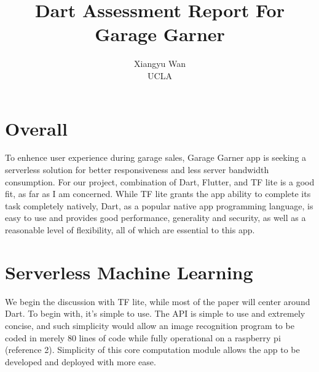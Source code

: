 \documentclass[letterpaper,twocolumn,10pt]{article}
\begin{document}

\date{}

\title{\Large \bf Dart Assessment Report For Garage Garner}

\author{
{\rm Xiangyu Wan}\\
UCLA
} %

\maketitle


\section{Overall}

To enhence user experience during garage sales, Garage Garner app is seeking a serverless solution for better responsiveness 
and less server bandwidth consumption.
For our project, combination of Dart, Flutter, and TF lite is a good fit, as far as I am concerned.
While TF lite grants the app ability to complete its task completely natively,
Dart, as a popular native app programming language, is easy to use and provides good performance, 
generality and security, as well as a reasonable level of flexibility, all of which are essential to this app.

\section{Serverless Machine Learning}

We begin the discussion with TF lite, while most of the paper will center around Dart.
To begin with, it's simple to use.
The API is simple to use and extremely concise, and such simplicity would allow an image recognition program to be coded in merely 80 lines of code
while fully operational on a raspberry pi (reference 2).
Simplicity of this core computation module allows the app to be developed and deployed with more ease.
\end{document}
